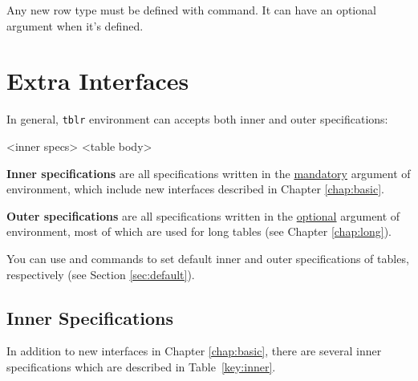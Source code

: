 \documentclass[oneside]{book}
\begin{document}
Any new row type must be defined with \CC{\NewTblrRowType} command.
It can have an optional argument when it's defined.

\chapter{Extra Interfaces}
\label{chap:extra}

In general, \verb!tblr! environment can accepts both inner and outer specifications:

\begin{codehigh}
\begin{tblr}{<inner specs>}
  <table body>
\end{tblr}
\end{codehigh}

\textbf{Inner specifications} are all specifications written in the \underline{mandatory} argument
of  environment, which include new interfaces described in Chapter \ref{chap:basic}.

\textbf{Outer specifications} are all specifications written in the \underline{optional} argument
of  environment, most of which are used for long tables (see Chapter \ref{chap:long}).

You can use \CC{\SetTblrInner} and \CC{\SetTblrOuter} commands
to set default inner and outer specifications of tables, respectively (see Section \ref{sec:default}).

\section{Inner Specifications}

In addition to new interfaces in Chapter \ref{chap:basic},
there are several inner specifications which are described in Table~\ref{key:inner}.
\end{document}
